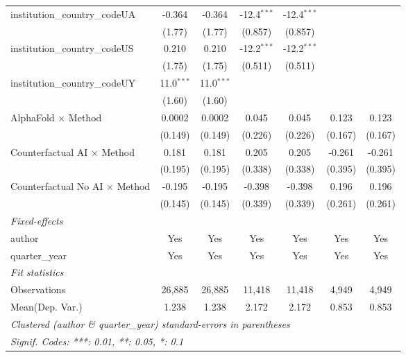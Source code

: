 \begin{tabular}{lcccccc}
   institution\_country\_codeUA          & -0.364        & -0.364        & -12.4$^{***}$ & -12.4$^{***}$ &               &   \\   
                                         & (1.77)        & (1.77)        & (0.857)       & (0.857)       &               &   \\   
   institution\_country\_codeUS          & 0.210         & 0.210         & -12.2$^{***}$ & -12.2$^{***}$ &               &   \\   
                                         & (1.75)        & (1.75)        & (0.511)       & (0.511)       &               &   \\   
   institution\_country\_codeUY          & 11.0$^{***}$  & 11.0$^{***}$  &               &               &               &   \\   
                                         & (1.60)        & (1.60)        &               &               &               &   \\   
   AlphaFold $\times$ Method             & 0.0002        & 0.0002        & 0.045         & 0.045         & 0.123         & 0.123\\   
                                         & (0.149)       & (0.149)       & (0.226)       & (0.226)       & (0.167)       & (0.167)\\   
   Counterfactual AI $\times$ Method     & 0.181         & 0.181         & 0.205         & 0.205         & -0.261        & -0.261\\   
                                         & (0.195)       & (0.195)       & (0.338)       & (0.338)       & (0.395)       & (0.395)\\   
   Counterfactual No AI $\times$ Method  & -0.195        & -0.195        & -0.398        & -0.398        & 0.196         & 0.196\\   
                                         & (0.145)       & (0.145)       & (0.339)       & (0.339)       & (0.261)       & (0.261)\\   
   \midrule
   \emph{Fixed-effects}\\
   author                                & Yes           & Yes           & Yes           & Yes           & Yes           & Yes\\  
   quarter\_year                         & Yes           & Yes           & Yes           & Yes           & Yes           & Yes\\  
   \midrule
   \emph{Fit statistics}\\
   Observations                          & 26,885        & 26,885        & 11,418        & 11,418        & 4,949         & 4,949\\  
Mean(Dep. Var.) & 1.238 & 1.238 & 2.172 & 2.172 & 0.853 & 0.853 \\
   \midrule \midrule
   \multicolumn{7}{l}{\emph{Clustered (author \& quarter\_year) standard-errors in parentheses}}\\
   \multicolumn{7}{l}{\emph{Signif. Codes: ***: 0.01, **: 0.05, *: 0.1}}\\
\end{tabular}
\par\endgroup
